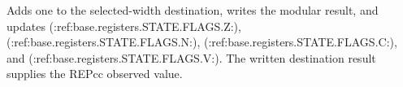 Adds one to the selected-width destination, writes the modular result, and updates (:ref:base.registers.STATE.FLAGS.Z:), (:ref:base.registers.STATE.FLAGS.N:), (:ref:base.registers.STATE.FLAGS.C:), and (:ref:base.registers.STATE.FLAGS.V:). The written destination result supplies the REPcc observed value.
